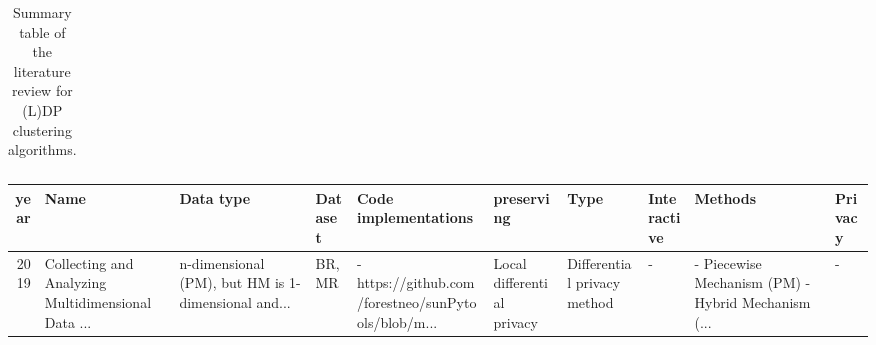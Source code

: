 \begin{landscape}
\begin{table}[ht]
\begin{adjustbox}{width=1.8\textwidth}
\begin{tabular}{rlllllllll}
        \bottomrule
      \end{tabular}
    \end{adjustbox}
    \caption{Summary table of the literature review for (L)DP clustering algorithms.}
  \end{table}


  \begin{table}[ht]
    \centering
    \begin{adjustbox}{width=1.8\textwidth}

      \begin{tabular}{rlllllllll}
        \toprule
        year                    & Name                                               & Data type                                          & Dataset                                            & Code implementations                               & preserving                 & Type                        & Interactive     & Methods                    & Privacy                         \\
        \midrule
        2019                    & Collecting and Analyzing Multidimensional Data ... & n-dimensional (PM), but HM is 1-dimensional and... & BR, MR                                             & -https://github.com/forestneo/sunPytools/blob/m... & Local differential privacy & Differential privacy method & -               & - Piecewise Mechanism (PM)
        - Hybrid Mechanism (... & -                                                                                                                                                                                                                                                                                                                                                             \\

\end{tabular}
\end{adjustbox}
\end{table}
\end{landscape}
